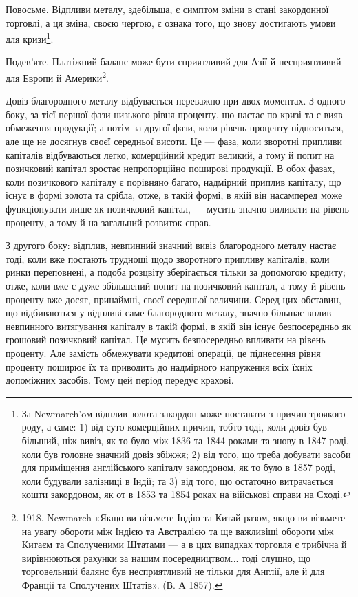 Повосьме. Відпливи металу, здебільша, є симптом зміни в стані закордонної
торговлі, а ця зміна, своєю чергою, є ознака того, що знову достигають
умови для кризи\footnote{
За Newmarch’oм відплив золота закордон може поставати з причин троякого роду, а саме:
1) від суто-комерційних причин, тобто тоді, коли довіз був більший, ніж вивіз, як то було між 1836
та 1844 роками та знову в 1847 роді, коли був головне значний довіз збіжжя; 2) від того, що треба
добувати засоби для приміщення англійського капіталу закордоном, як то було в 1857 роді, коли
будували
залізниці в Індії; та 3) від того, що остаточно витрачається кошти закордоном, як от в 1853
та 1854 роках на військові справи на Сході.
}.

Подев’яте. Платіжний баланс може бути сприятливий для Азії й несприятливий
для Европи й Америки\footnote{
1918. Newmarch «Якщо ви візьмете Індію та Китай разом, якщо ви візьмете на увагу
обороти між Індією та Австралією та ще важливіші обороти між Китаєм та Сполученими Штатами — а в
цих випадках торговля є трибічна й вирівнюються рахунки за нашим посередництвом... тоді слушно,
що торговельний балянс був несприятливий не тільки для Англії, але й для Франції та Сполучених
Штатів». (В. А 1857).
}.

Довіз благородного металу відбувається переважно при двох моментах.
З одного боку, за тієї першої фази низького рівня проценту, що настає по
кризі та є вияв обмеження продукції; а потім за другої фази, коли рівень проценту
підноситься, але ще не досягнув своєї середньої висоти. Це — фаза, коли
зворотні припливи капіталів відбуваються легко, комерційний кредит великий,
а тому й попит на позичковий капітал зростає непропорційно поширові продукції.
В обох фазах, коли позичкового капіталу є порівняно багато, надмірний
приплив капіталу, що існує в формі золота та срібла, отже, в такій формі,
в якій він насамперед може функціонувати лише як позичковий капітал, — мусить
значно виливати на рівень проценту, а тому й на загальний розвиток справ.

З другого боку: відплив, невпинний значний вивіз благородного металу
настає тоді, коли вже постають труднощі щодо зворотного припливу капіталів,
коли ринки переповнені, а подоба розцвіту зберігається тільки за допомогою
кредиту; отже, коли вже є дуже збільшений попит на позичковий капітал, а тому
й рівень проценту вже досяг, принаймні, своєї середньої величини. Серед цих
обставин, що відбиваються у відпливі саме благородного металу, значно більшає
вплив невпинного витягування капіталу в такій формі, в якій він існує безпосередньо
як грошовий позичковий капітал. Це мусить безпосередньо впливати
на рівень проценту. Але замість обмежувати кредитові операції, це піднесення
рівня проценту поширює їх та приводить до надмірного напруження всіх їхніх
допоміжних засобів. Тому цей період передує крахові.

